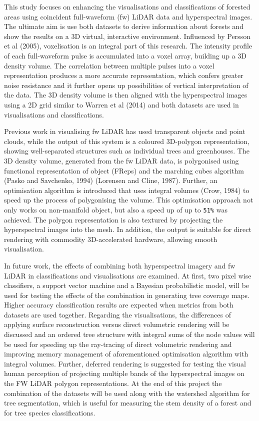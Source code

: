\documentclass{subfiles}
\begin{document}
	\par This study focuses on enhancing the visualisations and classifications of forested areas using coincident full-waveform (fw) LiDAR data and hyperspectral images. The ultimate aim is use both datasets to derive information about forests and show the results on a 3D virtual, interactive environment. Influenced by Persson et al (2005), voxelisation is an integral part of this research. The intensity profile of each full-waveform pulse is accumulated into a voxel array, building up a 3D density volume. The correlation between multiple pulses into a voxel representation produces a more accurate representation, which confers greater noise resistance and it further opens up possibilities of vertical interpretation of the data. The 3D density volume is then aligned with the hyperspectral images using a 2D grid similar to Warren et al (2014) and both datasets are used in visualisations and classifications. 
	\par Previous work in visualising fw LiDAR has used transparent objects and point clouds, while the output of this system is a coloured 3D-polygon representation, showing well-separated structures such as individual trees and greenhouses. The 3D density volume, generated from the fw LiDAR data, is polygonised using functional representation of object (FReps) and the marching cubes algorithm (Pasko and Savchenko, 1994) (Lorensen and Cline, 1987). Further, an optimisation algorithm is introduced that uses integral volumes (Crow, 1984) to speed up the process of polygonising the volume. This optimisation approach not only works on non-manifold object, but also a speed up of up to \verb|51%| was achieved. The polygon representation is also textured by projecting the hyperspectral images into the mesh. In addition, the output is suitable for direct rendering with commodity 3D-accelerated hardware, allowing smooth visualisation. 
	\par In future work, the effects of combining both hyperspectral imagery and fw LiDAR in classifications and visualisations are examined. At first, two pixel wise classifiers, a support vector machine and a Bayesian probabilistic model, will be used for testing the effects of the combination in generating tree coverage maps. Higher accuracy classification results are expected when metrics from both datasets are used together. Regarding the visualisations, the differences of applying surface reconstruction versus direct volumetric rendering will be discussed and an ordered tree structure with integral sums of the node values will be used for speeding up the ray-tracing of direct volumetric rendering and improving memory management of aforementioned optimisation algorithm with integral volumes. Further, deferred rendering is suggested for testing the visual human perception of projecting multiple bands of the hyperspectral images on the FW LiDAR polygon representations. At the end of this project the combination of the datasets will be used along with the watershed algorithm for tree segmentation, which is useful for measuring the stem density of a forest and for tree species classifications. 
	
\end{document}
